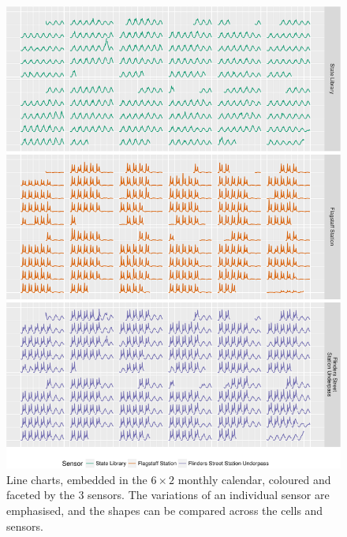 \documentclass[article]{jss}
\theoremstyle{definition}
\theoremstyle{definition}
\theoremstyle{remark}
\begin{document}
\begin{CodeChunk}
\begin{figure}

{\centering \includegraphics[width=\textwidth]{figure/facet-1} 

}

\caption[Line charts, embedded in the \(6 \times 2\) monthly
calendar, coloured and faceted by the 3 sensors. The variations of an
individual sensor are emphasised, and the shapes can be compared across
the cells and sensors.]{Line charts, embedded in the \(6 \times 2\) monthly
calendar, coloured and faceted by the 3 sensors. The variations of an
individual sensor are emphasised, and the shapes can be compared across
the cells and sensors.}\label{fig:facet}
\end{figure}
\end{CodeChunk}
\end{document}
